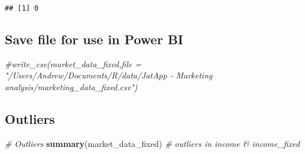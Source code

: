 \documentclass[]{article}
\newenvironment{Shaded}{\begin{snugshade}}{\end{snugshade}}
\newcommand{\CommentTok}[1]{\textcolor[rgb]{0.56,0.35,0.01}{\textit{#1}}}
\newcommand{\KeywordTok}[1]{\textcolor[rgb]{0.13,0.29,0.53}{\textbf{#1}}}
\newcommand{\NormalTok}[1]{#1}
\begin{document}
\begin{verbatim}
## [1] 0
\end{verbatim}

\hypertarget{save-file-for-use-in-power-bi}{%
\subsection{Save file for use in Power
BI}\label{save-file-for-use-in-power-bi}}

\begin{Shaded}
\begin{Highlighting}[]
\CommentTok{#write_csv(market_data_fixed,file = "/Users/Andrew/Documents/R/data/JatApp - Marketing analysis/marketing_data_fixed.csv")}
\end{Highlighting}
\end{Shaded}

\hypertarget{outliers}{%
\subsection{Outliers}\label{outliers}}

\begin{Shaded}
\begin{Highlighting}[]
\CommentTok{# Outliers}
\KeywordTok{summary}\NormalTok{(market_data_fixed) }\CommentTok{# outliers in income & income_fixed}
\end{Highlighting}
\end{Shaded}
\end{document}
